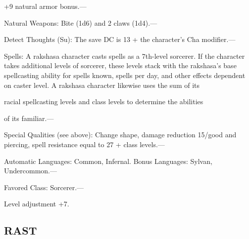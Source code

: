 \documentclass{article}
\begin{document}
\parindent=3pt
+9 natural armor bonus.---

\parindent=0pt
Natural Weapons: Bite (1d6) and 2 claws (1d4).---

Detect Thoughts (Su): The save DC is 13 + the character's Cha modifier.---

Spells: A rakshasa character casts spells as a 7th-level sorcerer. If the character 
takes additional levels of sorcerer, these levels stack with the rakshasa's base 
spellcasting ability for spells known, spells per day, and other effects dependent 
on caster level. A rakshasa character likewise uses the sum of its

racial spellcasting levels and class levels to determine the abilities

of its familiar.---

Special Qualities (see above): Change shape, damage reduction 15/good and piercing, 
spell resistance equal to 27 + class levels.---

Automatic Languages: Common, Infernal. Bonus Languages: Sylvan, Undercommon.---

Favored Class: Sorcerer.---

Level adjustment +7.

\vspace{12pt}
\subsection*{{\LARGE{}RAST}}
\end{document}
